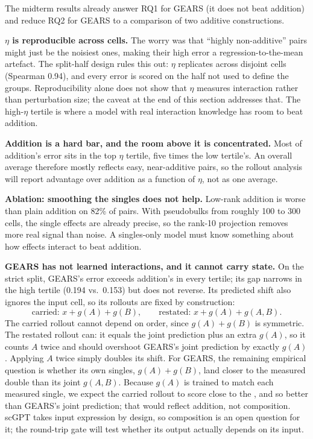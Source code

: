 The midterm results already answer RQ1 for GEARS (it does not beat addition) and reduce RQ2
for GEARS to a comparison of two additive constructions.

\noindent\textbf{$\eta$ is reproducible across cells.} The worry was that ``highly
non-additive'' pairs might just be the noisiest ones, making their high error a
regression-to-the-mean artefact. The split-half design rules this out: $\eta$ replicates
across disjoint cells (Spearman 0.94), and every error is scored on the half not used to
define the groups. Reproducibility alone does not show that $\eta$ measures interaction rather than perturbation
size; the caveat at the end of this section addresses that. The high-$\eta$ tertile is where a
model with real interaction knowledge has room to beat addition.

\noindent\textbf{Addition is a hard bar, and the room above it is concentrated.} Most of
addition's error sits in the top $\eta$ tertile, five times the low tertile's. An overall
average therefore mostly reflects easy, near-additive pairs, so the rollout analysis will
report advantage over addition as a function of $\eta$, not as one average.

\noindent\textbf{Ablation: smoothing the singles does not help.} Low-rank addition is worse
than plain addition on 82\% of pairs. With pseudobulks from roughly 100 to 300 cells, the
single effects are already precise, so the rank-10 projection removes more real signal than
noise. A singles-only model must know something about how effects interact to beat addition.

\noindent\textbf{GEARS has not learned interactions, and it cannot carry state.} On the
strict split, GEARS's error exceeds addition's in every tertile; its gap narrows in the high
tertile (0.194 vs.\ 0.153) but does not reverse. Its predicted shift also ignores the input
cell, so its rollouts are fixed by construction:
\begin{equation}
\text{carried: } x + g(A) + g(B), \qquad \text{restated: } x + g(A) + g(A,B).
\end{equation}
The carried rollout cannot depend on order, since $g(A) + g(B)$ is symmetric. The
restated rollout can: it equals the joint prediction plus an extra $g(A)$, so it counts $A$
twice and should overshoot GEARS's joint prediction by exactly $g(A)$. Applying $A$ twice
simply doubles its shift. For GEARS, the remaining empirical question is whether its own
singles, $g(A) + g(B)$, land closer to the measured double than its joint $g(A,B)$. Because
$g(A)$ is trained to match each measured single, we expect the carried rollout to score
close to the \addnull, and so better than GEARS's joint prediction; that would reflect
addition, not composition. scGPT takes input expression by design, so composition is an open question for it; the
round-trip gate will test whether its output actually depends on its input.

